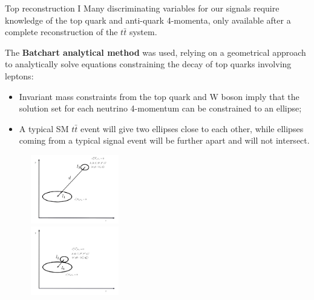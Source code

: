 \documentclass[8pt]{beamer}
\begin{document}
\begin{frame}{Top reconstruction I}
\justifying
Many discriminating variables for our signals require knowledge of the top quark and anti-quark 4-momenta, only available after a \alert{complete reconstruction of the $t \bar t$ system}. \vfill

The \textbf{Batchart analytical method} was used, relying on a geometrical approach to analytically solve equations constraining the decay of top quarks involving leptons:
\begin{itemize}
\justifying
\item Invariant mass constraints from the top quark and W boson imply that the solution set for each neutrino 4-momentum can be constrained to an ellipse;
\item A typical SM $t \bar t$ event will give two ellipses close to each other, while ellipses coming from a typical signal event will be further apart and will not intersect.
\end{itemize} \vfill

\begin{figure}[htbp]
\centering
\begin{minipage}[b]{.49\textwidth}
\begin{center}
\includegraphics[width=4cm, height=3cm]{figs/ElipseDM3.png}
\end{center}
\end{minipage}\hfill
\begin{minipage}[b]{.49\textwidth}
\begin{center}
\includegraphics[width=4cm, height=3cm]{figs/Elipsettnormal.png}
\end{center}
\end{minipage} \hfill
\label{fig:ellipsesDM}
\end{figure}
\end{frame}
\end{document}
